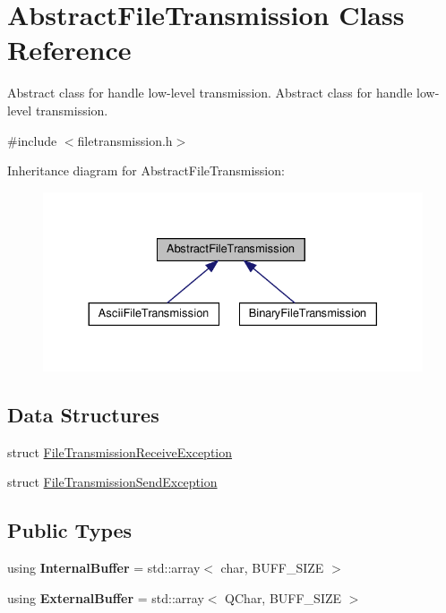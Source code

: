 \hypertarget{classAbstractFileTransmission}{}\section{Abstract\+File\+Transmission Class Reference}
\label{classAbstractFileTransmission}


Abstract class for handle low-\/level transmission.  Abstract class for handle low-\/level transmission.  




{\ttfamily \#include $<$filetransmission.\+h$>$}



Inheritance diagram for Abstract\+File\+Transmission\+:\nopagebreak
\begin{figure}[H]
\begin{center}
\leavevmode
\includegraphics[width=330pt]{dc/d3d/classAbstractFileTransmission__inherit__graph}
\end{center}
\end{figure}
\subsection*{Data Structures}
\begin{DoxyCompactItemize}
\item 
struct \hyperlink{structAbstractFileTransmission_1_1FileTransmissionReceiveException}{File\+Transmission\+Receive\+Exception}
\item 
struct \hyperlink{structAbstractFileTransmission_1_1FileTransmissionSendException}{File\+Transmission\+Send\+Exception}
\end{DoxyCompactItemize}
\subsection*{Public Types}
\begin{DoxyCompactItemize}
\item 
\mbox{\label{classAbstractFileTransmission_af504e5e76391ce4a4e5b8a090ba199b1}} 
using {\bfseries Internal\+Buffer} = std\+::array$<$ char, B\+U\+F\+F\+\_\+\+S\+I\+ZE $>$
\item 
\mbox{\label{classAbstractFileTransmission_a24ecd3592c22a52086a960772a8e08c1}} 
using {\bfseries External\+Buffer} = std\+::array$<$ Q\+Char, B\+U\+F\+F\+\_\+\+S\+I\+ZE $>$
\end{DoxyCompactItemize}
